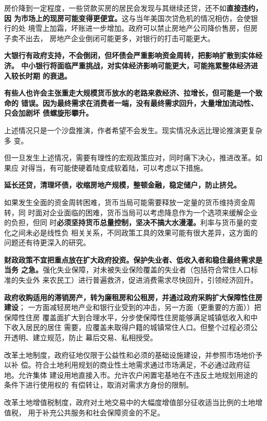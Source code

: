 房价降到一定程度，一些贷款买房的居民会发现与其继续还贷，还不如\textbf{直接违约，因
  为市场上的现房可能变得更便宜。}这与当年美国次贷危机的情况相仿，会使银行的处
境雪上加霜，坏账进一步增加。政府可以禁止房地产公司降价售房，但房子卖不出去，
房地产企业倒闭可能更多，对银行的打击可能更大。

\textbf{大银行有政府支持，不会倒闭，但坏债会严重影响资金周转，把影响扩散到实体经济。
中小银行将面临严重挑战，对实体经济影响可能更大，可能拖累整体经济进入较长时期
的衰退。}

\textbf{有些人也许会主张重走大规模货币放水的老路来救经济、拉增长，但可能是一个致命的
错误。因为最终需求在消费者一端，没有最终需求回升，大量增加流动性、只会加剧坏
债螺旋形攀升。}

上述情况只是一个沙盘推演，作者希望不会发生。现实情况永远比理论推演更复杂多
变。

但一旦发生上述情况，需要有理性的宏观政策应对，同时痛下决心，推进改革。如果应
对得当，有可能使硬着陆变成软着陆，可以考虑以下措施。

\textbf{延长还贷，清理坏债，收缩房地产规模，整顿金融，稳定储户，防止挤兑。}

如果发生全面的资金周转困难，货币当局可能需要释放一定量的货币维持资金周转，同
时面对企业面临的困难，货币当局可以考虑降息作为一个选项来缓解企业的负担，但同
时\textbf{必须坚持货币总量控制，坚决不搞大水漫灌。}利率与货币量的变化之间未必是线性负
相关关系，不同政策工具的效果可能有很大差异，这方面的问题还有待更深入的研究。

\textbf{财政政策不宜把重点放在扩大政府投资。保护失业者、低收入者和稳住最终需求是当务
之急。}强化失业保障，对未被失业保险覆盖的失业者（包括符合常住人口标准的失业外
来农民工）进行普遍救济，促进消费需求尽快回升，引领经济回升。

\textbf{政府收购适用的滞销房产，转为廉租房和公租房，并通过政府采购扩大保障性住房建设}；
一方面减轻房地产业和银行业受到的冲击，另一方面（更重要的方面））把保障性住房
覆盖面扩大到合理水平，分步使保障性住房能够满足城镇低收入和中下收入居民的居住
需要，应覆盖未取得户籍的城镇常住人口。但整个过程必须公开透明、建立规范，防止
幕后交易、私相授受。

改革土地制度，政府征地仅限于公益性和必须的基础设施建设，并参照市场地价予以补
偿。符合土地利用规划的商业性土地需求通过市场满足，不必通过政府征地。允许集体
建设用地直接入市。允许农户闲置宅基地在不违反土地规划用途的条件下进行使用权的
有偿转让，取消对需求方身份的限制。

改革土地增值税制度，政府对土地交易中的大幅度增值部分征收适当比例的土地增值税，
用于补充公共服务和社会保障资金的不足。

